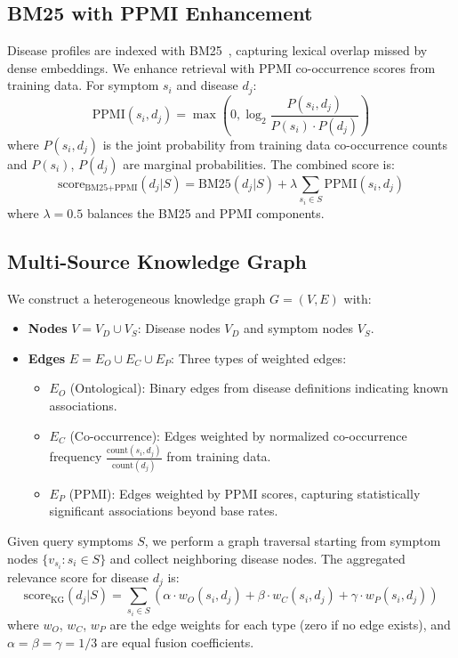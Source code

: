 \documentclass[preprint,12pt]{elsarticle}
\begin{document}
\subsection{BM25 with PPMI Enhancement}
\label{sec:bm25}

Disease profiles are indexed with BM25~\cite{robertson2009probabilistic}, capturing lexical overlap missed by dense embeddings. We enhance retrieval with PPMI co-occurrence scores from training data. For symptom $s_i$ and disease $d_j$:
\begin{equation}
    \text{PPMI}(s_i, d_j) = \max\left(0, \log_2 \frac{P(s_i, d_j)}{P(s_i) \cdot P(d_j)}\right)
\end{equation}
where $P(s_i, d_j)$ is the joint probability from training data co-occurrence counts and $P(s_i)$, $P(d_j)$ are marginal probabilities. The combined score is:
\begin{equation}
    \text{score}_{\text{BM25+PPMI}}(d_j | S) = \text{BM25}(d_j | S) + \lambda \sum_{s_i \in S} \text{PPMI}(s_i, d_j)
\end{equation}
where $\lambda = 0.5$ balances the BM25 and PPMI components.

\subsection{Multi-Source Knowledge Graph}
\label{sec:kg}

We construct a heterogeneous knowledge graph $G = (V, E)$ with:
\begin{itemize}
    \item \textbf{Nodes} $V = V_D \cup V_S$: Disease nodes $V_D$ and symptom nodes $V_S$.
    \item \textbf{Edges} $E = E_O \cup E_C \cup E_P$: Three types of weighted edges:
    \begin{itemize}
        \item $E_O$ (Ontological): Binary edges from disease definitions indicating known associations.
        \item $E_C$ (Co-occurrence): Edges weighted by normalized co-occurrence frequency $\frac{\text{count}(s_i, d_j)}{\text{count}(d_j)}$ from training data.
        \item $E_P$ (PPMI): Edges weighted by PPMI scores, capturing statistically significant associations beyond base rates.
    \end{itemize}
\end{itemize}

Given query symptoms $S$, we perform a graph traversal starting from symptom nodes $\{v_{s_i} : s_i \in S\}$ and collect neighboring disease nodes. The aggregated relevance score for disease $d_j$ is:
\begin{equation}
    \text{score}_{\text{KG}}(d_j | S) = \sum_{s_i \in S} \left(\alpha \cdot w_O(s_i, d_j) + \beta \cdot w_C(s_i, d_j) + \gamma \cdot w_P(s_i, d_j)\right)
\label{eq:kg_score}
\end{equation}
where $w_O$, $w_C$, $w_P$ are the edge weights for each type (zero if no edge exists), and $\alpha = \beta = \gamma = 1/3$ are equal fusion coefficients.
\end{document}
